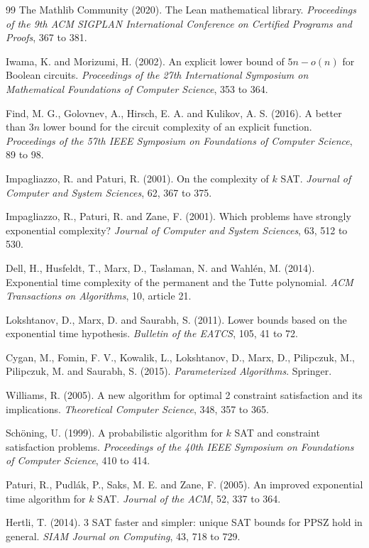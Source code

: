 \documentclass[11pt,twoside,openany]{book}
\theoremstyle{plain}
\theoremstyle{definition}
\theoremstyle{remark}
\begin{document}
\begin{thebibliography}{99}
 The Mathlib Community (2020). The Lean mathematical library. \emph{Proceedings of the 9th ACM SIGPLAN International Conference on Certified Programs and Proofs}, 367 to 381.


 Iwama, K. and Morizumi, H. (2002). An explicit lower bound of $5n - o(n)$ for Boolean circuits. \emph{Proceedings of the 27th International Symposium on Mathematical Foundations of Computer Science}, 353 to 364.

 Find, M. G., Golovnev, A., Hirsch, E. A. and Kulikov, A. S. (2016). A better than $3n$ lower bound for the circuit complexity of an explicit function. \emph{Proceedings of the 57th IEEE Symposium on Foundations of Computer Science}, 89 to 98.

 Impagliazzo, R. and Paturi, R. (2001). On the complexity of $k$ SAT. \emph{Journal of Computer and System Sciences}, 62, 367 to 375.

 Impagliazzo, R., Paturi, R. and Zane, F. (2001). Which problems have strongly exponential complexity? \emph{Journal of Computer and System Sciences}, 63, 512 to 530.

 Dell, H., Husfeldt, T., Marx, D., Taslaman, N. and Wahl\'en, M. (2014). Exponential time complexity of the permanent and the Tutte polynomial. \emph{ACM Transactions on Algorithms}, 10, article 21.

 Lokshtanov, D., Marx, D. and Saurabh, S. (2011). Lower bounds based on the exponential time hypothesis. \emph{Bulletin of the EATCS}, 105, 41 to 72.

 Cygan, M., Fomin, F. V., Kowalik, L., Lokshtanov, D., Marx, D., Pilipczuk, M., Pilipczuk, M. and Saurabh, S. (2015). \emph{Parameterized Algorithms}. Springer.

 Williams, R. (2005). A new algorithm for optimal 2 constraint satisfaction and its implications. \emph{Theoretical Computer Science}, 348, 357 to 365.

 Sch\"oning, U. (1999). A probabilistic algorithm for $k$ SAT and constraint satisfaction problems. \emph{Proceedings of the 40th IEEE Symposium on Foundations of Computer Science}, 410 to 414.

 Paturi, R., Pudl\'ak, P., Saks, M. E. and Zane, F. (2005). An improved exponential time algorithm for $k$ SAT. \emph{Journal of the ACM}, 52, 337 to 364.

 Hertli, T. (2014). 3 SAT faster and simpler: unique SAT bounds for PPSZ hold in general. \emph{SIAM Journal on Computing}, 43, 718 to 729.


\end{thebibliography}
\end{document}
